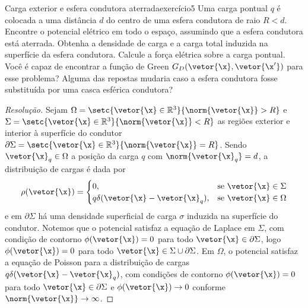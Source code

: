 \begin{exercício}{Carga exterior e esfera condutora aterrada}{exercício5}
    Uma carga pontual \(q\) é colocada a uma distância \(d\) do centro de uma esfera condutora de raio \(R < d\). Encontre o potencial elétrico em todo o espaço, assumindo que a esfera condutora está aterrada. Obtenha a densidade de carga e a carga total induzida na superfície da esfera condutora. Calcule a força elétrica sobre a carga pontual. Você é capaz de encontrar a função de Green \(G_D(\vetor{\x}, \vetor{\x'})\) para esse problema? Alguma das repostas mudaria caso a esfera condutora fosse substituída por uma casca esférica condutora?
\end{exercício}
\begin{proof}[Resolução]
    Sejam \(\Omega = \setc{\vetor{\x} \in \mathbb{R}^3}{\norm{\vetor{\x}} > R}\) e \(\Sigma = \setc{\vetor{\x} \in \mathbb{R}^3}{\norm{\vetor{\x}} < R}\) as regiões exterior e interior à superfície do condutor \(\partial \Sigma = \setc{\vetor{\x} \in \mathbb{R}^3}{\norm{\vetor{\x}} = R}\). Sendo \(\vetor{\x}_q \in \Omega\) a posição da carga \(q\) com \(\norm{\vetor{\x}_q} = d\), a distribuição de cargas é dada por
    \begin{equation*}
        \rho(\vetor{\x}) = \begin{cases}
            0,&\text{se }\vetor{\x} \in \Sigma\\
            q \delta(\vetor{\x} - \vetor{\x}_q),&\text{se }\vetor{\x}\in \Omega
        \end{cases}
    \end{equation*}
    e em \(\partial \Sigma\) há uma densidade superficial de carga \(\sigma\) induzida na superfície do condutor. Notemos que o potencial satisfaz a equação de Laplace em \(\Sigma\), com condição de contorno \(\phi(\vetor{\x}) = 0\) para todo \(\vetor{\x} \in \partial\Sigma\), logo \(\phi(\vetor{\x}) = 0\) para todo \(\vetor{\x} \in \Sigma \cup \partial \Sigma\). Em \(\Omega\), o potencial satisfaz a equação de Poisson para a distribuição de cargas \(q \delta(\vetor{\x} - \vetor{\x}_q)\), com condições de contorno \(\phi(\vetor{\x}) = 0\) para todo \(\vetor{\x} \in \partial\Sigma\) e \(\phi(\vetor{\x}) \to 0\) conforme \(\norm{\vetor{\x}} \to \infty\).


\end{proof}
